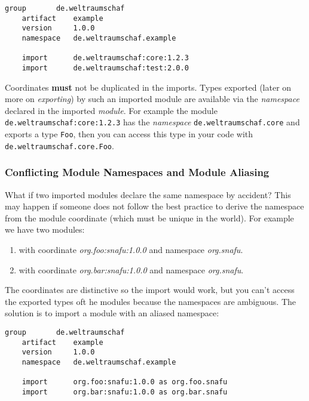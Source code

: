 \documentclass[11pt,a4paper]{report}
\begin{document}
\begin{lstlisting}[language=CayThe, title=Module manifest with imports]
    group       de.weltraumschaf
    artifact    example
    version     1.0.0
    namespace   de.weltraumschaf.example

    import      de.weltraumschaf:core:1.2.3
    import      de.weltraumschaf:test:2.0.0
\end{lstlisting}

Coordinates \textbf{must} not be duplicated in the imports. Types exported (later on more on \textit{exporting}) by such an imported module are available via the \textit{namespace} declared in the imported \textit{module}. For example the module \texttt{de.weltraumschaf:core:1.2.3} has the \textit{namespace} \texttt{de.weltraumschaf.core} and exports a type \texttt{Foo}, then you can access this type in your code with \texttt{de.weltraumschaf.core.Foo}.

\subsubsection{Conflicting Module Namespaces and Module Aliasing}

What if two imported modules declare the same namespace by accident? This may happen if someone does not follow the best practice to derive the namespace from the module coordinate (which must be unique in the world). For example we have two modules:

\begin{enumerate}
    \item with coordinate \textit{org.foo:snafu:1.0.0} and namespace \textit{org.snafu}.
    \item with coordinate \textit{org.bar:snafu:1.0.0} and namespace \textit{org.snafu}.
\end{enumerate}

The coordinates are distinctive so the import would work, but you can't access the exported types oft he modules because the namespaces are ambiguous. The solution is to import a module with an aliased namespace:

\begin{lstlisting}[language=CayThe, title=Module manifest aliased namespaces]
    group       de.weltraumschaf
    artifact    example
    version     1.0.0
    namespace   de.weltraumschaf.example

    import      org.foo:snafu:1.0.0 as org.foo.snafu
    import      org.bar:snafu:1.0.0 as org.bar.snafu
\end{lstlisting}
\end{document}
